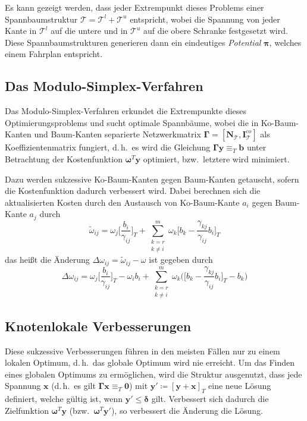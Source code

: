 \documentclass[a4paper, 10pt, twocolumn]{scrartcl}
\newcommand{\mat}[1]{\boldsymbol{#1}}
\renewcommand{\vec}[1]{\boldsymbol{#1}}
\newcommand{\bzw}{bzw.~}
\renewcommand{\dh}{d.\,h.~}
\begin{document}
			Es kann gezeigt werden, dass jeder Extrempunkt dieses Problems einer Spannbaumstruktur \( \mathcal{T} = \mathcal{T}^l + \mathcal{T}^u \) entspricht, wobei die Spannung von jeder Kante in \( \mathcal{T}^l \) auf die untere und in \( \mathcal{T}^u \) auf die obere Schranke festgesetzt wird. Diese Spannbaumstrukturen generieren dann ein eindeutiges \emph{Potential}  \(\vec{\pi}\), welches einem Fahrplan entspricht.
	
	\subsection*{Das Modulo-Simplex-Verfahren}
		Das Modulo-Simplex-Verfahren erkundet die Extrempunkte dieses Optimierungsproblems und sucht optimale Spannbäume, wobei die in Ko-Baum-Kanten und Baum-Kanten separierte Netzwerkmatrix \( \mat{\Gamma} = [\mat{N}_\mathcal{T}, \mat{I}_\mathcal{T}^\mathit{co}] \) als Koeffizientenmatrix fungiert, \dh es wird die Gleichung \( \mat{\Gamma} \vec{y} \equiv_T \vec{b} \) unter Betrachtung der Kostenfunktion \( \vec{\omega}^T \vec{y} \) optimiert, \bzw letztere wird minimiert.
		
		Dazu werden sukzessive Ko-Baum-Kanten gegen Baum-Kanten getauscht, sofern die Kostenfunktion dadurch verbessert wird. Dabei berechnen sich die aktualisierten Kosten durch den Austausch von Ko-Baum-Kante \( a_i \) gegen Baum-Kante \( a_j \) durch
		\begin{equation*}
			\tilde{\omega}_{ij} = \omega_j \bigg[ \frac{b_i}{\gamma_{ij}} \bigg]_T \! + \sum_{\substack{k = r \\ k \neq i}}^{m} \omega_k \bigg[ b_k - \frac{\gamma_{kj}}{\gamma_{ij}} b_i \bigg]_T
		\end{equation*}
		das heißt die Änderung \( \Delta\omega_{ij} = \tilde{\omega}_{ij} - \omega \) ist gegeben durch
		\begin{equation*}
			\Delta\omega_{ij} = \omega_j \bigg[ \frac{b_i}{\gamma_{ij}} \bigg]_T \! - \omega_i b_i + \sum_{\substack{k = r \\ k \neq i}}^{m} \omega_k \Bigg( \bigg[ b_k - \frac{\gamma_{kj}}{\gamma_{ij}} b_i \bigg]_T - b_k \Bigg)
		\end{equation*}
	
	\subsection*{Knotenlokale Verbesserungen}
		Diese sukzessive Verbesserungen führen in den meisten Fällen nur zu einem lokalen Optimum, \dh das globale Optimum wird nie erreicht. Um das Finden eines globalen Optimums zu ermöglichen, wird die Struktur ausgenutzt, dass jede Spannung \(\vec{x}\) (\dh es gilt \( \mat{\Gamma} \vec{x} \equiv_T \vec{0} \)) mit \( \vec{y}' \coloneqq [\vec{y} + \vec{x}]_T \) eine neue Lösung definiert, welche gültig ist, wenn \( \vec{y}' \leq \vec{\delta} \) gilt. Verbessert sich dadurch die Zielfunktion \( \vec{\omega}^T \vec{y} \) (\bzw \( \vec{\omega}^T \vec{y}' \)), so verbessert die Änderung die Lösung.
		
\end{document}
